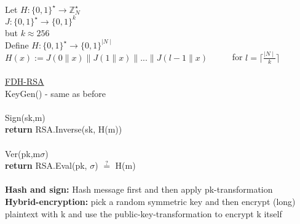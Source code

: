 \documentclass{report}
\begin{document}
	\\
	Let $H : \{ 0,1 \}^{\star} \rightarrow \mathbb{Z}_N^{\star}$ \\
	$J : \{ 0,1 \}^{\star} \rightarrow \{ 0,1 \}^{k}$ \\
	but $k \approx 256$ \\
	Define  $H : \{ 0,1 \}^{\star} \rightarrow \{ 0,1 \}^{\mid N \mid}$ \\
	$H(x) := J(0 \| x) \| J(1 \| x) \| ... \| J(l-1 \| x)$ \ \ \ \ \ for $l = \lceil\frac{\mid N \mid}{k}\rceil$ \\
	\\ 
	\underline{FDH-RSA} \\
	KeyGen() - same as before \\
	\\
	Sign(sk,m) \\
	\textbf{return} RSA.Inverse(sk, H(m)) \\
	\\
	Ver(pk,m$\sigma$) \\
	\textbf{return} RSA.Eval(pk, $\sigma$) $\stackrel{?}{=}$ H(m) \\
	\\
	\textbf{Hash and sign:} Hash message first and then apply pk-transformation \\
	\textbf{Hybrid-encryption:} pick a random symmetric key and then encrypt (long) plaintext with k and use the public-key-transformation to encrypt k itself \\
	\newpage
\end{document}
